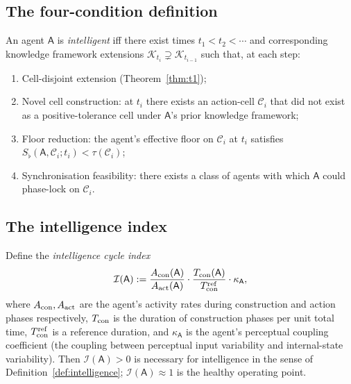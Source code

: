 \documentclass[11pt,twocolumn,a4paper]{article}
\newcommand{\K}{\mathcal{K}}
\newcommand{\Cell}{\mathcal{C}}
\newcommand{\agent}{\mathsf{A}}
\newcommand{\Sfloor}{S_{\flat}}
\newcommand{\Iindex}{\mathcal{I}}
\newcommand{\Acon}{A_{\rm con}}
\newcommand{\Aact}{A_{\rm act}}
\newcommand{\Tcon}{T_{\rm con}}
\begin{document}
\subsection{The four-condition definition}

\begin{definition}[Intelligence]\label{def:intelligence}
An agent $\agent$ is \emph{intelligent} iff there exist times $t_1 < t_2 < \cdots$ and
corresponding knowledge framework extensions $\K_{t_i} \supsetneq \K_{t_{i-1}}$ such that,
at each step:
\begin{enumerate}[label=(\roman*),leftmargin=*]
\item Cell-disjoint extension (Theorem~\ref{thm:t1});
\item Novel cell construction: at $t_i$ there exists an action-cell $\Cell_i$ that did
not exist as a positive-tolerance cell under $\agent$'s prior knowledge framework;
\item Floor reduction: the agent's effective floor on $\Cell_i$ at $t_i$ satisfies
$\Sfloor(\agent, \Cell_i; t_i) < \tau(\Cell_i)$;
\item Synchronisation feasibility: there exists a class of agents with which $\agent$
could phase-lock on $\Cell_i$.
\end{enumerate}
\end{definition}

\subsection{The intelligence index}

\begin{theorem}\label{thm:t4}
Define the \emph{intelligence cycle index}
\[
\Iindex(\agent) := \frac{\Acon(\agent)}{\Aact(\agent)} \cdot \frac{\Tcon(\agent)}{\Tcon^{\rm ref}} \cdot \kappa_\agent,
\]
where $\Acon, \Aact$ are the agent's activity rates during construction and action
phases respectively, $\Tcon$ is the duration of construction phases per unit total time,
$\Tcon^{\rm ref}$ is a reference duration, and $\kappa_\agent$ is the agent's perceptual
coupling coefficient (the coupling between perceptual input variability and
internal-state variability). Then $\Iindex(\agent) > 0$ is necessary for intelligence
in the sense of Definition~\ref{def:intelligence}; $\Iindex(\agent) \approx 1$ is the
healthy operating point.
\end{theorem}
\end{document}
